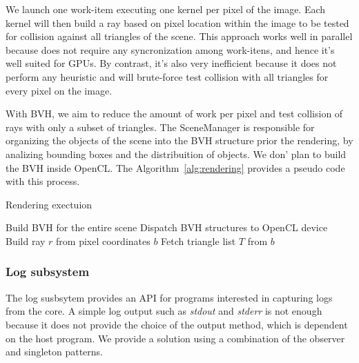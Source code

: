 \documentclass[a4paper]{sbgames}               %
\begin{document}
We launch one work-item executing one kernel per pixel of the
image. Each kernel will then build a ray based on pixel location
within the image to be tested for collision against all triangles of
the scene. This approach works well in parallel because does not
require any syncronization among work-itens, and hence it's well
suited for GPUs. By contrast, it's also very inefficient because it
does not perform any heuristic and will brute-force test collision
with all triangles for every pixel on the image.

With BVH, we aim to reduce the amount of work per pixel and test
collision of rays with only a subset of triangles. The SceneManager is
responsible for organizing the objects of the scene into the BVH
structure prior the rendering, by analizing bounding boxes and the
distribuition of objects. We don' plan to build the BVH inside
OpenCL. The Algorithm~\ref{alg:rendering} provides a pseudo code
with this process.

\begin{algorithm}
\caption{Rendering exectuion}
\label{alg:rendering}
\begin{algorithmic}[1]
\State Build BVH for the entire scene
\State Dispatch BVH structures to OpenCL device
\EndProcedure
{}
\State Build ray $r$ from pixel coordinates
\Return $b$
\EndIf
\EndFor
\State Fetch triangle list $T$ from $b$
\EndIf
\EndFor
\EndFor
\EndProcedure
\end{algorithmic}
\end{algorithm}


\subsubsection{Log subsystem}

The log susbsytem provides an API for programs interested in capturing
logs from the core. A simple log output such as \emph{stdout} and
\emph{stderr} is not enough because it does not provide the choice of
the output method, which is dependent on the host program. We provide
a solution using a combination of the observer and singleton patterns.
\end{document}
